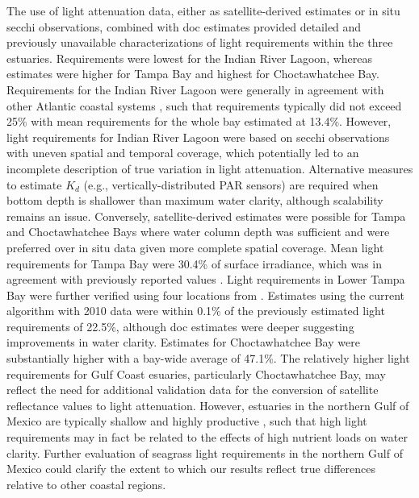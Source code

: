 \documentclass[letterpaper,12pt,oneside]{article}\usepackage[]{graphicx}\usepackage[]{color}
\begin{document}
The use of light attenuation data, either as satellite-derived estimates or in situ secchi observations, combined with \ac{doc} estimates provided detailed and previously unavailable characterizations of light requirements within the three estuaries.  Requirements were lowest for the Indian River Lagoon, whereas estimates were higher for Tampa Bay and highest for Choctawhatchee Bay. Requirements for the Indian River Lagoon were generally in agreement with other Atlantic coastal systems \citep{Dennison93,Kemp04}, such that requirements typically did not exceed 25\% with mean requirements for the whole bay estimated at 13.4\%.  However, light requirements for Indian River Lagoon were based on secchi observations with uneven spatial and temporal coverage, which potentially led to an incomplete description of true variation in light attenuation.  Alternative measures to estimate $K_d$ (e.g., vertically-distributed PAR sensors) are required when bottom depth is shallower than maximum water clarity, although scalability remains an issue.  Conversely, satellite-derived estimates were possible for Tampa and Choctawhatchee Bays where water column depth was sufficient and were preferred over in situ data given more complete spatial coverage. Mean light requirements for Tampa Bay were 30.4\% of surface irradiance, which was in agreement with previously reported values \citep{Dixon95}.  Light requirements in Lower Tampa Bay were further verified using four locations from \citet{Dixon95}.  Estimates using the current algorithm with 2010 data were within 0.1\% of the previously estimated light requirements of 22.5\%, although \ac{doc} estimates were deeper suggesting improvements in water clarity.  Estimates for Choctawhatchee Bay were substantially higher with a bay-wide average of 47.1\%.  The relatively higher light requirements for Gulf Coast esuaries, particularly Choctawhatchee Bay, may reflect the need for additional validation data for the conversion of satellite reflectance values to light attenuation.  However, estuaries in the northern Gulf of Mexico are typically shallow and highly productive \citep{Caffrey14}, such that high light requirements may in fact be related to the effects of high nutrient loads on water clarity.  Further evaluation of seagrass light requirements in the northern Gulf of Mexico could clarify the extent to which our results reflect true differences relative to other coastal regions.
\end{document}
